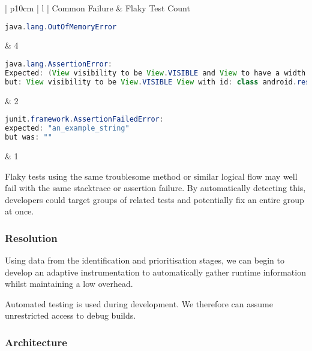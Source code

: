 \begin{center}
    \begin{tabular}{| p{10cm} | l |}
    \hline
    Common Failure & Flaky Test Count \\ \hline
    {\begin{lstlisting}[language=Java, numbers=none]
java.lang.OutOfMemoryError
	\end{lstlisting}}
    & 4 \\ \hline
    {\begin{lstlisting}[language=Java, numbers=none]
java.lang.AssertionError:
Expected: (View visibility to be View.VISIBLE and View to have a width and a height)
but: View visibility to be View.VISIBLE View with id: class android.resources.R$id.anExampleView(1) had a visibility of View.GONE
	\end{lstlisting}}
	& 2 \\ \hline
    {\begin{lstlisting}[language=Java, numbers=none]
junit.framework.AssertionFailedError:
expected: "an_example_string"
but was: ""
	\end{lstlisting}}
	& 1 \\ \hline

    \end{tabular}
\end{center}

Flaky tests using the same troublesome method or similar logical flow may well fail with the same stacktrace or assertion failure. By automatically detecting this, developers could target groups of related tests and potentially fix an entire group at once.


\subsubsection{Resolution}

Using data from the identification and prioritisation stages, we can begin to develop an adaptive instrumentation to automatically gather runtime information whilst maintaining a low overhead.


Automated testing is used during development. We therefore can assume unrestricted access to debug builds.


\subsubsection{Architecture}

